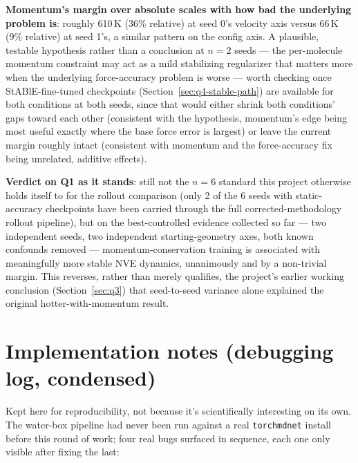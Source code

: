 \documentclass[11pt]{article}
\begin{document}
\textbf{Momentum's margin over absolute scales with how bad the underlying
problem is}: roughly 610\,K (36\% relative) at seed 0's velocity axis versus
66\,K (9\% relative) at seed 1's, a similar pattern on the config axis. A
plausible, testable hypothesis rather than a conclusion at $n=2$ seeds ---
the per-molecule momentum constraint may act as a mild stabilizing
regularizer that matters more when the underlying force-accuracy problem is
worse --- worth checking once StABlE-fine-tuned checkpoints
(Section~\ref{sec:q4-stable-path}) are available for both conditions at
both seeds, since that would either shrink both conditions' gaps toward
each other (consistent with the hypothesis, momentum's edge being most
useful exactly where the base force error is largest) or leave the current
margin roughly intact (consistent with momentum and the force-accuracy fix
being unrelated, additive effects).

\textbf{Verdict on Q1 as it stands}: still not the $n=6$ standard this
project otherwise holds itself to for the rollout comparison (only 2 of the
6 seeds with static-accuracy checkpoints have been carried through the full
corrected-methodology rollout pipeline), but on the best-controlled evidence
collected so far --- two independent seeds, two independent starting-geometry
axes, both known confounds removed --- momentum-conservation training is
associated with meaningfully more stable NVE dynamics, unanimously and by a
non-trivial margin. This reverses, rather than merely qualifies, the
project's earlier working conclusion (Section~\ref{sec:q3}) that
seed-to-seed variance alone explained the original hotter-with-momentum
result.

\appendix

\section{Implementation notes (debugging log, condensed)}
\label{app:impl}

Kept here for reproducibility, not because it's scientifically interesting
on its own. The water-box pipeline had never been run against a real
\texttt{torchmdnet} install before this round of work; four real bugs
surfaced in sequence, each one only visible after fixing the last:
\end{document}
